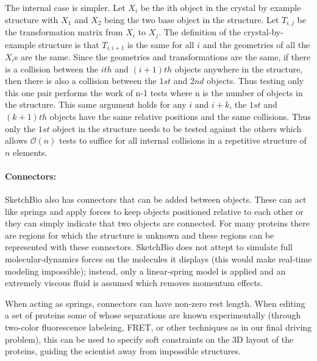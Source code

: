 \documentclass[twocolumn]{bmcart}%
\begin{document}
The internal case is simpler.  Let $X_i$ be the ith object in the crystal by example structure with $X_1$ and $X_2$ being the two base object in the structure.
Let $T_{i,j}$ be the transformation matrix from $X_i$ to $X_j$.
The definition of the crystal-by-example structure is that $T_{i,i+1}$ is the same for all $i$ and the geometries of all the $X_i$s are the same.
Since the geometries and transformations are the same, if there is a collision between the $ith$ and $(i+1)th$ objects anywhere in the structure, then there is also a collision between the $1st$ and $2nd$ objects.
Thus testing only this one pair performs the work of n-1 tests where n is the number of objects in the structure.
This same argument holds for any $i$ and $i+k$, the $1st$ and $(k+1)th$ objects have the same relative positions and the same collisions.
Thus only the $1st$ object in the structure needs to be tested against the others which allows $\mathcal{O}(n)$ tests to suffice for all internal collisions in a repetitive structure of $n$ elements.


\paragraph*{Connectors:}
SketchBio also has connectors that can be added between objects.
These can act like springs and apply forces to keep objects positioned relative to each other or they can simply indicate that two objects are connected.
For many proteins there are regions for which the structure is unknown and these regions can be represented with these connectors.
SketchBio does not attept to simulate full molecular-dynamics forces on the molecules it displays (this would make real-time modeling impossible); instead, only a linear-spring model is applied and an extremely viscous fluid is assumed which removes momentum effects.

When acting as springs, connectors can have non-zero rest length.
When editing a set of proteins some of whose separations are known experimentally (through two-color fluorescence labeleing, FRET, or other techniques as in our final driving problem), this can be used to specify soft constraints on the 3D layout of the proteins, guiding the scientist away from impossible structures.
\end{document}
